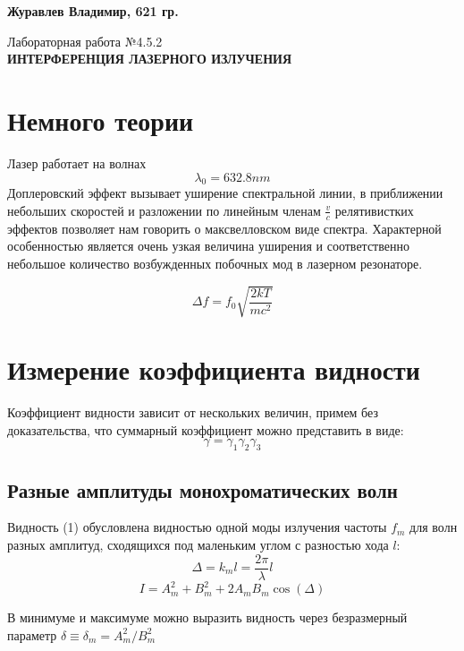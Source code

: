 \documentclass[12pt,a4paper]{article}
\author{Владимир Журавлев}
\begin{document}
\begin{flushright}

\textbf{Журавлев Владимир, 621 гр.\\}


\end{flushright}
\begin{center}
\begin{LARGE}

\vspace{\baselineskip}
Лабораторная работа №4.5.2\\
\textbf{
ИНТЕРФЕРЕНЦИЯ
ЛАЗЕРНОГО ИЗЛУЧЕНИЯ}\\
\vspace{\baselineskip}

\end{LARGE}
\end{center}
\section{Немного теории}
Лазер работает на волнах 
\[\lambda_0 = 632.8 nm \]
Доплеровский эффект вызывает уширение спектральной линии, в приближении небольших скоростей и разложении по линейным членам $\frac{v}{c}$ релятивистких эффектов позволяет нам говорить о максвелловском виде спектра. Характерной особенностью является очень узкая величина уширения и соответственно небольшое количество возбужденных побочных мод в лазерном резонаторе. 

\[\Delta f = f_0 \sqrt{\frac{2kT}{mc^2}} \]


\section{Измерение коэффициента видности}

Коэффициент видности зависит от нескольких величин, примем без доказательства, что суммарный коэффициент можно представить в виде:
\[\gamma = \gamma_1 \gamma_2 \gamma_3 \]
\subsection{Разные амплитуды монохроматических волн }

Видность (1) обусловлена видностью одной моды излучения частоты $f_m$ для волн разных амплитуд, сходящихся под маленьким углом  с разностью хода $l$:
\[ \Delta = k_m l  = \frac{2 \pi}{\lambda} l\]
\[ I = A_m^2 + B_m^2 + 2A_m B_m \cos (\Delta) \]

В минимуме и максимуме можно выразить видность через безразмерный параметр $\delta \equiv\delta_m = A^2_m / B^2_m$ 
\end{document}
